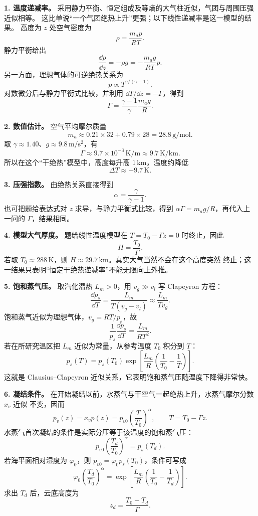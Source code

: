 \begin{xesolution}
\textbf{1. 温度递减率。} 采用静力平衡、恒定组成及等熵的大气柱近似，气团与周围压强近似相等。
这比单说“一个气团绝热上升”更强；以下线性递减率是这一模型的结果。
高度为 $z$ 处空气密度为
\[
  \rho=\frac{m_a p}{RT}.
\]
静力平衡给出
\[
  \frac{\dd p}{\dd z}=-\rho g=-\frac{m_ag}{RT}p.
\]
另一方面，理想气体的可逆绝热关系为
\[
  p\propto T^{\gamma/(\gamma-1)}.
\]
对数微分后与静力平衡式比较，并利用 $\dd T/\dd z=-\Gamma$，得到
\[
  \boxed{\Gamma=\frac{\gamma-1}{\gamma}\frac{m_ag}{R}}.
\]

\textbf{2. 数值估计。} 空气平均摩尔质量
\[
  m_a\approx0.21\times32+0.79\times28=28.8\,\mathrm{g/mol}.
\]
取 $\gamma\approx1.40$、$g\approx9.8\,\mathrm{m/s^2}$，有
\[
  \Gamma\approx9.7\times10^{-3}\,\mathrm{K/m}
  \approx9.7\,\mathrm{K/km}.
\]
所以在这个“干绝热”模型中，高度每升高 $1\,\mathrm{km}$，温度约降低
\[
  \boxed{\Delta T\approx-9.7\,\mathrm K}.
\]

\textbf{3. 压强指数。} 由绝热关系直接得到
\[
  \boxed{\alpha=\frac{\gamma}{\gamma-1}}.
\]
也可把题给表达式对 $z$ 求导，与静力平衡式比较，得到 $\alpha\Gamma=m_ag/R$，再代入上一问的
$\Gamma$，结果相同。

\textbf{4. 模型大气厚度。} 题给线性温度模型在 $T=T_0-\Gamma z=0$ 时终止，因此
\[
  \boxed{H=\frac{T_0}{\Gamma}}.
\]
若取 $T_0\approx288\,\mathrm K$，则 $H\approx29.7\,\mathrm{km}$。真实大气当然不会在这个高度突然
终止；这一结果只表明“恒定干绝热递减率”不能无限向上外推。

\textbf{5. 饱和蒸气压。} 取汽化潜热 $L_m>0$，用 $v_g\gg v_l$ 写 Clapeyron 方程：
\[
  \frac{\dd p_s}{\dd T}
  =\frac{L_m}{T(v_g-v_l)}
  \approx\frac{L_m}{Tv_g}.
\]
饱和蒸气近似为理想气体，$v_g=RT/p_s$，故
\[
  \frac{1}{p_s}\frac{\dd p_s}{\dd T}
  =\frac{L_m}{RT^2}.
\]
若在所研究温区把 $L_m$ 近似为常量，从参考温度 $T_0$ 积分到 $T$：
\[
  \boxed{p_s(T)=p_s(T_0)
  \exp\!\left[\frac{L_m}{R}\left(\frac1{T_0}-\frac1T\right)\right]}.
\]
这就是 Clausius--Clapeyron 近似关系，它表明饱和蒸气压随温度下降得非常快。

\textbf{6. 凝结条件。} 在开始凝结以前，水蒸气与干空气一起绝热上升，水蒸气摩尔分数 $x_v$ 近似
不变，因而
\[
  p_v(z)=x_vp(z)=p_{v0}\left(\frac{T}{T_0}\right)^\alpha,
  \qquad T=T_0-\Gamma z.
\]
水蒸气首次凝结的条件是实际分压等于该温度的饱和蒸气压：
\[
  \boxed{p_{v0}\left(\frac{T_d}{T_0}\right)^\alpha=p_s(T_d)}.
\]
若海平面相对湿度为 $\varphi_0$，则 $p_{v0}=\varphi_0p_s(T_0)$，条件可写成
\[
  \boxed{\varphi_0\left(\frac{T_d}{T_0}\right)^\alpha
  =\exp\!\left[\frac{L_m}{R}
  \left(\frac1{T_0}-\frac1{T_d}\right)\right]}.
\]
求出 $T_d$ 后，云底高度为
\[
  \boxed{z_d=\frac{T_0-T_d}{\Gamma}}.
\]


\end{xesolution}

